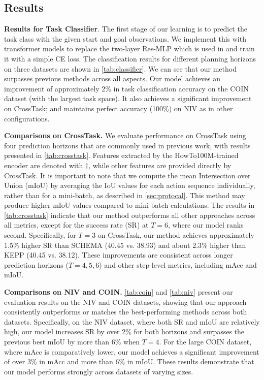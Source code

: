 \subsection{Results}
 
\textbf{Results for Task Classifier}. The first stage of our learning is to predict the task class with the given start and goal observations. We implement this with transformer models to replace the two-layer Res-MLP which is used in \citet{wang2023pdpp} and train it with a simple CE loss. The classification results for different planning horizons on three datasets are shown in \cref{tab:classifier}. We can see that our method surpasses previous methods across all aspects. Our model achieves an improvement of approximately 2\% in task classification accuracy on the COIN dataset (with the largest task space). It also achieves a significant improvement on CrossTask; and maintains perfect accuracy (100\%) on NIV as in other configurations.


\textbf{Comparisons on CrossTask.} We evaluate performance on CrossTask using four prediction horizons that are commonly used in previous work, with results presented in \cref{tab:crosstask}. Features extracted by the HowTo100M-trained encoder are denoted with $\dagger$, while other features are provided directly by CrossTask. It is important to note that we compute the mean Intersection over Union (mIoU) by averaging the IoU values for each action sequence individually, rather than for a mini-batch, as described in \cref{sec:protocal}. This method may produce higher mIoU values compared to mini-batch calculations. The results in \cref{tab:crosstask} indicate that our method outperforms all other approaches across all metrics, except for the success rate (SR) at $T = 6$, where our model ranks second. Specifically, for $T = 3$ on CrossTask, our method achieves approximately 1.5\% higher SR than SCHEMA (40.45 vs. 38.93) and about 2.3\% higher than KEPP (40.45 vs. 38.12). These improvements are consistent across longer prediction horizons ($T = 4, 5, 6$) and other step-level metrics, including mAcc and mIoU. 



\textbf{Comparisons on NIV and COIN.} \cref{tab:coin} and \cref{tab:niv} present our evaluation results on the NIV and COIN datasets, showing that our approach consistently outperforms or matches the best-performing methods across both datasets. Specifically, on the NIV dataset, where both SR and mIoU are relatively high, our model increases SR by over 2\% for both horizons and surpasses the previous best mIoU by more than 6\% when $T=4$. For the large COIN dataset, where mAcc is comparatively lower, our model achieves a significant improvement of over 3\% in mAcc and more than 6\% in mIoU. These results demonstrate that our model performs strongly across datasets of varying sizes.

